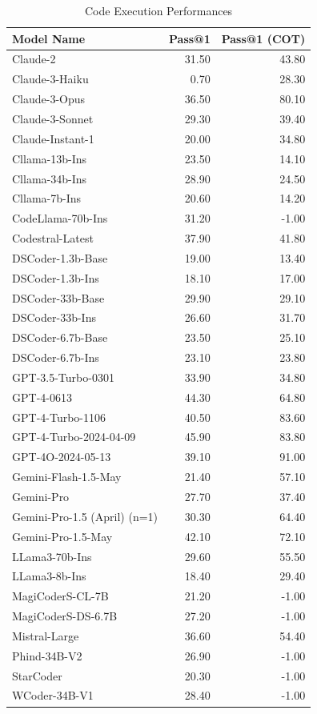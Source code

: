 \begin{table}[ht]
\centering
\begin{tabular}{lrr}
    \hline
Model Name & Pass@1 & Pass@1 (COT) \\
    \hline
Claude-2 & 31.50 & 43.80 \\
Claude-3-Haiku & 0.70 & 28.30 \\
Claude-3-Opus & 36.50 & 80.10 \\
Claude-3-Sonnet & 29.30 & 39.40 \\
Claude-Instant-1 & 20.00 & 34.80 \\
Cllama-13b-Ins & 23.50 & 14.10 \\
Cllama-34b-Ins & 28.90 & 24.50 \\
Cllama-7b-Ins & 20.60 & 14.20 \\
CodeLlama-70b-Ins & 31.20 & -1.00 \\
Codestral-Latest & 37.90 & 41.80 \\
DSCoder-1.3b-Base & 19.00 & 13.40 \\
DSCoder-1.3b-Ins & 18.10 & 17.00 \\
DSCoder-33b-Base & 29.90 & 29.10 \\
DSCoder-33b-Ins & 26.60 & 31.70 \\
DSCoder-6.7b-Base & 23.50 & 25.10 \\
DSCoder-6.7b-Ins & 23.10 & 23.80 \\
GPT-3.5-Turbo-0301 & 33.90 & 34.80 \\
GPT-4-0613 & 44.30 & 64.80 \\
GPT-4-Turbo-1106 & 40.50 & 83.60 \\
GPT-4-Turbo-2024-04-09 & 45.90 & 83.80 \\
GPT-4O-2024-05-13 & 39.10 & 91.00 \\
Gemini-Flash-1.5-May & 21.40 & 57.10 \\
Gemini-Pro & 27.70 & 37.40 \\
Gemini-Pro-1.5 (April) (n=1) & 30.30 & 64.40 \\
Gemini-Pro-1.5-May & 42.10 & 72.10 \\
LLama3-70b-Ins & 29.60 & 55.50 \\
LLama3-8b-Ins & 18.40 & 29.40 \\
MagiCoderS-CL-7B & 21.20 & -1.00 \\
MagiCoderS-DS-6.7B & 27.20 & -1.00 \\
Mistral-Large & 36.60 & 54.40 \\
Phind-34B-V2 & 26.90 & -1.00 \\
StarCoder & 20.30 & -1.00 \\
WCoder-34B-V1 & 28.40 & -1.00 \\
    \hline
\end{tabular}
\caption{Code Execution Performances}
\end{table}
